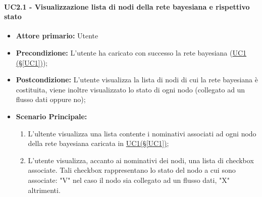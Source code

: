 \paragraph{UC2.1 - Visualizzazione lista di nodi della rete bayesiana e rispettivo stato}\label{UC2.1}
\begin{itemize}
\item \textbf{Attore primario:}  Utente
\item \textbf{Precondizione:} L'utente ha caricato con successo la rete bayesiana (\hyperref[UC1]{UC1 									(§\ref*{UC1})});
\item \textbf{Postcondizione:} L'utente visualizza la lista di nodi di cui la rete bayesiana è costituita, viene 			inoltre visualizzato lo stato di ogni nodo (collegato ad un flusso dati oppure no);
\item \textbf{Scenario Principale:}
	\begin{enumerate}
	\item L'ultente visualizza una lista contente i nominativi associati ad ogni nodo della rete bayesiana caricata 				in \hyperref[UC1]{UC1(§\ref*{UC1})};
	\item L'utente visualizza, accanto ai nominativi dei nodi, una lista di checkbox associate. Tali checkbox 							rappresentano lo stato del nodo a cui sono associate: "V" nel caso il nodo sia collegato ad un flusso dati, "X" 		altrimenti.
	\end{enumerate}
\end{itemize}

